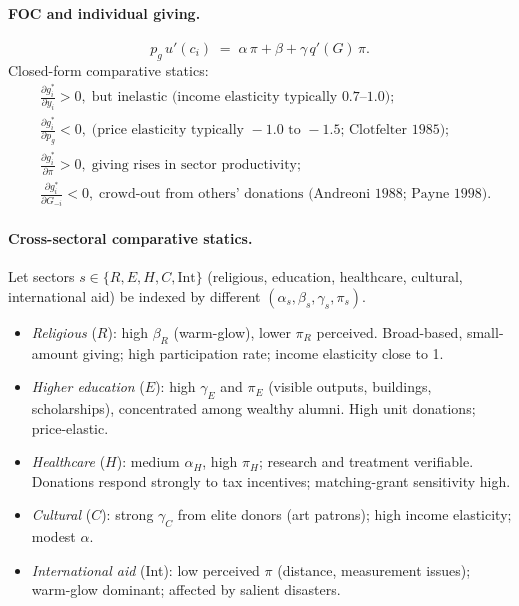 \documentclass[11pt,a4paper]{article}
\begin{document}
\paragraph{FOC and individual giving.}
\begin{equation}
p_{g}\,u'(c_{i})\;=\;\alpha\,\pi+\beta+\gamma\,q'(G)\,\pi.
\label{eq:q5_donor_FOC}
\end{equation}
Closed-form comparative statics:
\begin{align*}
&\frac{\partial g_{i}^{*}}{\partial y_{i}}>0,\;\text{but inelastic (income elasticity typically }0.7\text{--}1.0\text{)};\\
&\frac{\partial g_{i}^{*}}{\partial p_{g}}<0,\;\text{(price elasticity typically }-1.0\text{ to }-1.5\text{; Clotfelter 1985)};\\
&\frac{\partial g_{i}^{*}}{\partial\pi}>0,\;\text{giving rises in sector productivity};\\
&\frac{\partial g_{i}^{*}}{\partial G_{-i}}<0,\;\text{crowd-out from others' donations (Andreoni 1988; Payne 1998)}.
\end{align*}

\paragraph{Cross-sectoral comparative statics.}
Let sectors $s\in\{R,E,H,C,\text{Int}\}$ (religious, education, healthcare, cultural, international aid) be indexed by different $(\alpha_{s},\beta_{s},\gamma_{s},\pi_{s})$.
\begin{itemize}[leftmargin=*,itemsep=2pt]
    \item \emph{Religious} ($R$): high $\beta_{R}$ (warm-glow), lower $\pi_{R}$ perceived. Broad-based, small-amount giving; high participation rate; income elasticity close to 1.
    \item \emph{Higher education} ($E$): high $\gamma_{E}$ and $\pi_{E}$ (visible outputs, buildings, scholarships), concentrated among wealthy alumni. High unit donations; price-elastic.
    \item \emph{Healthcare} ($H$): medium $\alpha_{H}$, high $\pi_{H}$; research and treatment verifiable. Donations respond strongly to tax incentives; matching-grant sensitivity high.
    \item \emph{Cultural} ($C$): strong $\gamma_{C}$ from elite donors (art patrons); high income elasticity; modest $\alpha$.
    \item \emph{International aid} (Int): low perceived $\pi$ (distance, measurement issues); warm-glow dominant; affected by salient disasters.
\end{itemize}
\end{document}
